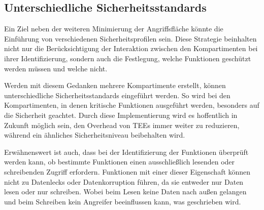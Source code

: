 \subsection{Unterschiedliche Sicherheitsstandards}
Ein Ziel neben der weiteren Minimierung der Angriffsfläche könnte die Einführung von verschiedenen Sicherheitsprofilen sein. Diese Strategie beinhalten nicht nur die Berücksichtigung der Interaktion zwischen den Kompartimenten bei ihrer Identifizierung, sondern auch die Festlegung, welche Funktionen geschützt werden müssen und welche nicht.

Werden mit diesem Gedanken mehrere Kompartimente erstellt, können unterschiedliche Sicherheitsstandards eingeführt werden. So wird bei den Kompartimenten, in denen kritische Funktionen ausgeführt werden, besonders auf die Sicherheit geachtet. Durch diese Implementierung wird es hoffentlich in Zukunft möglich sein, den Overhead von TEEs immer weiter zu reduzieren, während ein ähnliches Sicherheitsniveau beibehalten wird.

Erwähnenswert ist auch, dass bei der Identifizierung der Funktionen überprüft werden kann, ob bestimmte Funktionen einen ausschließlich lesenden oder schreibenden Zugriff erfordern. Funktionen mit einer dieser Eigenschaft können nicht zu Datenlecks oder Datenkorruption führen, da sie entweder nur Daten lesen oder nur schreiben. Wobei beim Lesen keine Daten nach außen gelangen und beim Schreiben kein Angreifer beeinflussen kann, was geschrieben wird. 